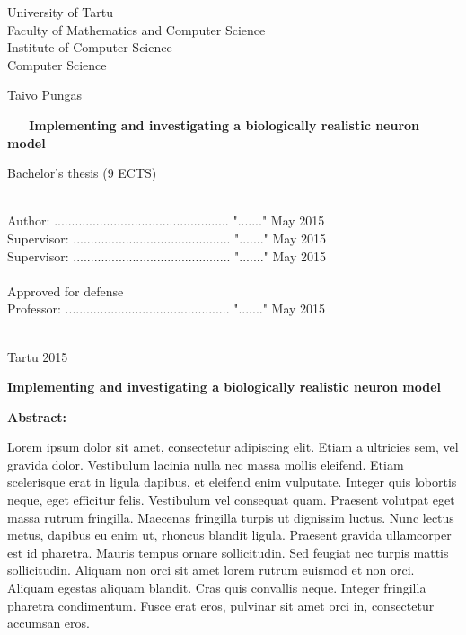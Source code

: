 \documentclass[a4paper,12pt]{report}
\theoremstyle{definition}
\newcommand{\thesistitle}{Implementing and investigating a biologically realistic neuron model} %
\begin{document}
\begin{center}
	{\Large
	University of Tartu\\
	Faculty of Mathematics and Computer Science\\
	Institute of Computer Science\\
	Computer Science\\}
	
	\vspace{2.5cm}
	
	{\LARGE Taivo Pungas}\\
	\vspace{0.5cm}
	\begin{spacing}{2}{\Huge\bf \ \ \ \thesistitle}\end{spacing}
	\vspace{0.5cm}
	{\LARGE Bachelor's thesis (9 ECTS)}
\end{center}
\vspace{3cm}
\hspace{7.2cm}{\Large Supervisors: Dr. Raul Vicente\\}
\vspace{-0.5cm}

\hspace{10.4cm}{\Large Dr. Jaan Aru \\}

\ \\
Author: .................................................. "......." May 2015\\
Supervisor: ............................................. "......." May 2015\\
Supervisor: ............................................. "......." May 2015\\
\ \\
Approved for defense\\
Professor: ............................................... "......." May 2015\\
\ \\
\begin{center}
	{\Large Tartu 2015}
\end{center}
\thispagestyle{empty}
\pagebreak




{\textbf
{\Large \thesistitle}}

\textbf{Abstract:}

Lorem ipsum dolor sit amet, consectetur adipiscing elit. Etiam a ultricies sem, vel gravida dolor. Vestibulum lacinia nulla nec massa mollis eleifend. Etiam scelerisque erat in ligula dapibus, et eleifend enim vulputate. Integer quis lobortis neque, eget efficitur felis. Vestibulum vel consequat quam. Praesent volutpat eget massa rutrum fringilla. Maecenas fringilla turpis ut dignissim luctus. Nunc lectus metus, dapibus eu enim ut, rhoncus blandit ligula. Praesent gravida ullamcorper est id pharetra. Mauris tempus ornare sollicitudin. Sed feugiat nec turpis mattis sollicitudin. Aliquam non orci sit amet lorem rutrum euismod et non orci. Aliquam egestas aliquam blandit. Cras quis convallis neque. Integer fringilla pharetra condimentum. Fusce erat eros, pulvinar sit amet orci in, consectetur accumsan eros.
\end{document}
